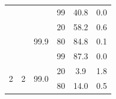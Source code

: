 \documentclass{article}
\begin{document}
\begin{table}
\begin{tabular}{|c|c|c|c|c|c|}
                                    &                                                                                        &                                                                                          & 99                                                                                      & 40.8                                                                      & 0.0                                                                       \\ \cline{3-6} 
                                    &                                                                                        & \multirow{3}{*}{99.9}                                                                    & 20                                                                                      & 58.2                                                                      & 0.6                                                                       \\ \cline{4-6} 
                                    &                                                                                        &                                                                                          & 80                                                                                      & 84.8                                                                      & 0.1                                                                       \\ \cline{4-6} 
                                    &                                                                                        &                                                                                          & 99                                                                                      & 87.3                                                                      & 0.0                                                                       \\ \hline
\multirow{12}{*}{2}                 & \multirow{6}{*}{2}                                                                     & \multirow{3}{*}{99.0}                                                                    & 20                                                                                      & 3.9                                                                       & 1.8                                                                       \\ \cline{4-6} 
                                    &                                                                                        &                                                                                          & 80                                                                                      & 14.0                                                                      & 0.5                                                                       \\ \cline{4-6} 

\end{tabular}
\end{table}
\end{document}
